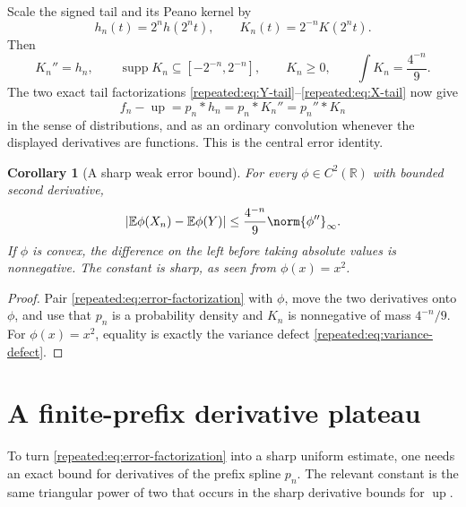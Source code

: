 \documentclass[11pt,oneside]{article}
\newtheorem{corollary}[theorem]{Corollary}
\theoremstyle{definition}
\theoremstyle{remark}
\newcommand{\R}{\mathbb R}
\newcommand{\Up}{\operatorname{up}}
\newcommand{\E}{\mathbb E}
\newcommand{\supp}{\operatorname{supp}}
\begin{document}
Scale the signed tail and its Peano kernel by
\begin{equation}
 h_n(t)=2^nh(2^nt),
 \qquad
 K_n(t)=2^{-n}K(2^nt).                                     \label{repeated:eq:scaled-K}
\end{equation}
Then
\begin{equation}
 K_n''=h_n,
 \qquad
 \supp K_n\subseteq[-2^{-n},2^{-n}],
 \qquad
 K_n\ge0,
 \qquad
 \int K_n=\frac{4^{-n}}9.                                 \label{repeated:eq:scaled-K-properties}
\end{equation}
The two exact tail factorizations \eqref{repeated:eq:Y-tail}--\eqref{repeated:eq:X-tail} now give
\begin{equation}
 f_n-\Up=p_n*h_n=p_n*K_n''=p_n''*K_n                       \label{repeated:eq:error-factorization}
\end{equation}
in the sense of distributions, and as an ordinary convolution whenever the displayed
derivatives are functions.  This is the central error identity.

\begin{corollary}[A sharp weak error bound]
\label{repeated:cor:weak-error}
For every $\phi\in C^2(\R)$ with bounded second derivative,
\begin{equation}
 \left|\E\phi(X_n)-\E\phi(Y)\right|
 \le\frac{4^{-n}}9\norm{\phi''}_\infty.                   \label{repeated:eq:weak-error}
\end{equation}
If $\phi$ is convex, the difference on the left before taking absolute values is nonnegative.
The constant is sharp, as seen from $\phi(x)=x^2$.
\end{corollary}

\begin{proof}
Pair \eqref{repeated:eq:error-factorization} with $\phi$, move the two derivatives onto $\phi$, and use
that $p_n$ is a probability density and $K_n$ is nonnegative of mass $4^{-n}/9$.
For $\phi(x)=x^2$, equality is exactly the variance defect \eqref{repeated:eq:variance-defect}.
\end{proof}

\section{A finite-prefix derivative plateau}
\label{repeated:sec:prefix-derivatives}

To turn \eqref{repeated:eq:error-factorization} into a sharp uniform estimate, one needs an exact bound
for derivatives of the prefix spline $p_n$.  The relevant constant is the same triangular
power of two that occurs in the sharp derivative bounds for $\Up$.
\end{document}
